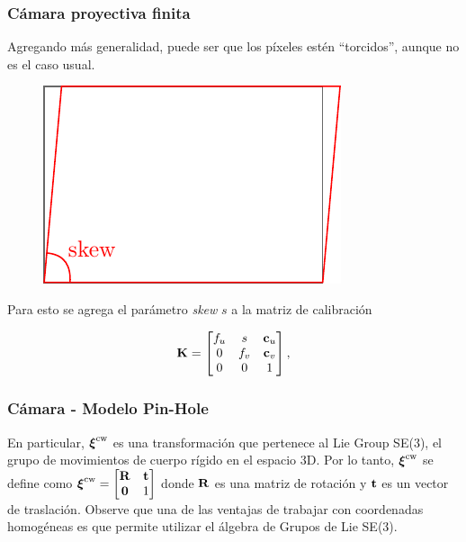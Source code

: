 \begin{frame}
    \frametitle{Cámara proyectiva finita}
    \footnotesize
    
    Agregando más generalidad, puede ser que los píxeles estén ``torcidos'', aunque no es el caso usual.
    
    \begin{figure}[!h]
        \includegraphics[width=0.3\columnwidth]{images/camera/pixel_skew.pdf}
    \end{figure}
    
    Para esto se agrega el parámetro \emph{skew} $s$ a la matriz de calibración
    
    \begin{equation*}
        \boldsymbol{\mathbf{K}}=
        \begin{bmatrix}f_{u} & s & \boldsymbol{\mathbf{c}}_{u}\\
            0 & f_{v} & \boldsymbol{\mathbf{c}}_{v}\\
            0 & 0 & 1
        \end{bmatrix},
    \end{equation*}
    
\end{frame}

\begin{frame}
    \frametitle{Cámara - Modelo Pin-Hole}
    
    \footnotesize
    
    En particular, $\boldsymbol{\mathbf{\xi}}^{\mathrm{c}\mathrm{w}}$ es una transformación que pertenece al Lie Group SE(3), el grupo de movimientos de cuerpo rígido en el espacio 3D. Por lo tanto, $\boldsymbol{\mathbf{\xi}}^{\mathrm{c}\mathrm{w}}$ se define como
    $\boldsymbol{\mathbf{\xi}}^{\mathrm{c}\mathrm{w}}=
    \begin{bmatrix}\boldsymbol{\mathbf{R}} & \boldsymbol{\mathbf{t}}\\
        \boldsymbol{\mathbf{0}} & 1
    \end{bmatrix}$ donde $\boldsymbol{\mathbf{R}}$ es una matriz de rotación y $\boldsymbol{\mathbf{t}}$ es un vector de traslación. Observe que una de las ventajas de trabajar con coordenadas homogéneas es que permite utilizar el álgebra de Grupos de Lie SE(3).
    
\end{frame}

